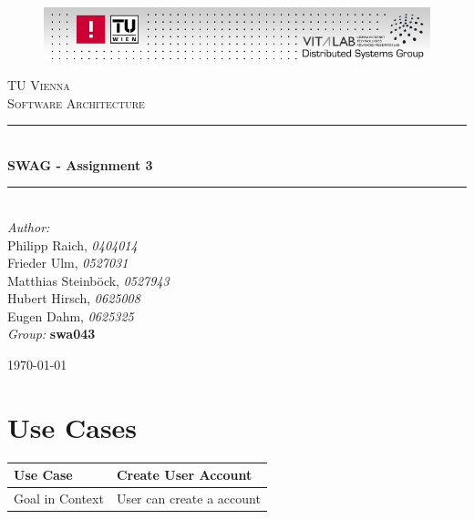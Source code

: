 \documentclass[a4paper]{article}
\newcommand{\TITLE}{SWAG - Assignment 3}
\newcommand{\AUTHOR}{
  Philipp Raich, \emph{0404014}\\
  Frieder Ulm, \emph{0527031}\\
	Matthias Steinböck, \emph{0527943}\\
	Hubert Hirsch, \emph{0625008}\\
	Eugen Dahm, \emph{0625325} 
}
\newcommand{\GROUP}{swa043}
\newcommand{\HRule}{\rule{\linewidth}{0.25mm}}
\begin{document}
\begin{titlepage}

\begin{center}

\begin{figure}[ht!]
  \begin{center}
  \includegraphics[width=1\textwidth]{fig/vitalab-header.png}
  \label{fig:component_diagram}
  \end{center}
\end{figure}


\textsc{\LARGE TU Vienna}\\[1.5cm]

\textsc{\Large Software Architecture}\\[0.5cm]


\HRule \\[0.4cm]
{ \huge \bfseries \TITLE}\\[0.15cm]

\HRule \\[1.5cm]

\emph{Author:}\\
\large{\AUTHOR\\}
\vfill
\normalsize\emph{Group:}
\large\textbf{\GROUP}\\

\vfill

{\normalsize \today}

\end{center}

\end{titlepage}

\section{Use Cases}

\begin{tabular}[t]{|l|l|l|}
\hline
\textbf{Use Case}	&	\multicolumn{2}{|l|}{\textbf{Create User Account}}\\
\hline
Goal in Context	&	\multicolumn{2}{|l|}{User can create a account}\\
\hline
\end{tabular}\\
\end{document}
